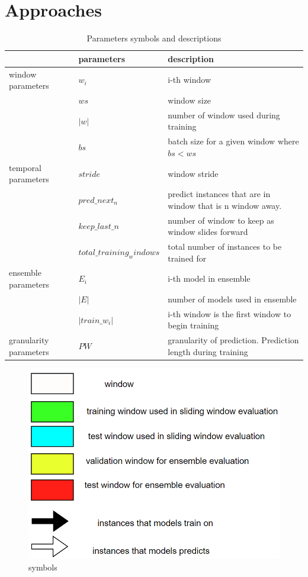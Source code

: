 \documentclass{IEEEtran}
\begin{document}
\section{Approaches}
\label{sec:org309856c}
\begin{table}[htbp]
\caption{\label{parameters}Parameters symbols and descriptions}
\centering
\begin{tabular}{lll}
\hline
\hline
 & parameters & description\\
\hline
window parameters & \(w_i\) & i-th window\\
 & \(ws\) & window size\\
 & \(\vert w \vert\) & number of window used during training\\
 & \(bs\) & batch size for a given window where \(bs < ws\)\\
temporal parameters & \(stride\) & window stride\\
 & \(pred\_next_{n}\) & predict instances that are in window that is n window away.\\
 & \(keep\_last\_n\) & number of window to keep as window slides forward\\
 & \(total\_training_windows\) & total number of instances to be trained for\\
ensemble parameters & \(E_i\) & i-th model in ensemble\\
 & \(\vert E \vert\) & number of models used in ensemble\\
 & \(\vert train\_w_{i} \vert\) & i-th window is the first window to begin training\\
granularity parameters & \(PW\) & granularity of prediction. Prediction length during training\\
\end{tabular}
\end{table}

\begin{figure}[htbp]
\centering
\includegraphics[width=.9\linewidth]{./images/screenshot_20220321_130824.png}
\caption{\label{symbols}symbols}
\end{figure}
\end{document}
